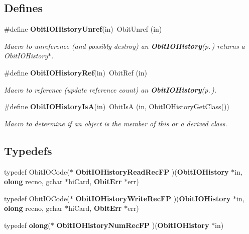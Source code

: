 \subsection*{Defines}
\begin{CompactItemize}
\item 
\#define {\bf Obit\-IOHistory\-Unref}(in)\ Obit\-Unref (in)
\begin{CompactList}\small\item\em Macro to unreference (and possibly destroy) an {\bf Obit\-IOHistory}{\rm (p.\,\pageref{structObitIOHistory})} returns a Obit\-IOHistory$\ast$. \item\end{CompactList}\item 
\#define {\bf Obit\-IOHistory\-Ref}(in)\ Obit\-Ref (in)
\begin{CompactList}\small\item\em Macro to reference (update reference count) an {\bf Obit\-IOHistory}{\rm (p.\,\pageref{structObitIOHistory})}. \item\end{CompactList}\item 
\#define {\bf Obit\-IOHistory\-Is\-A}(in)\ Obit\-Is\-A (in, Obit\-IOHistory\-Get\-Class())
\begin{CompactList}\small\item\em Macro to determine if an object is the member of this or a derived class. \item\end{CompactList}\end{CompactItemize}
\subsection*{Typedefs}
\begin{CompactItemize}
\item 
typedef Obit\-IOCode($\ast$ {\bf Obit\-IOHistory\-Read\-Rec\-FP} )({\bf Obit\-IOHistory} $\ast$in, {\bf olong} recno, gchar $\ast$hi\-Card, {\bf Obit\-Err} $\ast$err)
\item 
typedef Obit\-IOCode($\ast$ {\bf Obit\-IOHistory\-Write\-Rec\-FP} )({\bf Obit\-IOHistory} $\ast$in, {\bf olong} recno, gchar $\ast$hi\-Card, {\bf Obit\-Err} $\ast$err)
\item 
typedef {\bf olong}($\ast$ {\bf Obit\-IOHistory\-Num\-Rec\-FP} )({\bf Obit\-IOHistory} $\ast$in)
\end{CompactItemize}
